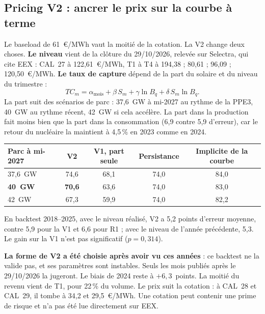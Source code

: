 \documentclass[11pt,a4paper]{article}
\begin{document}
\subsection{Pricing V2 : ancrer le prix sur la courbe à terme}
\label{sec:v2}

Le baseload de 61~€/MWh vaut la moitié de la cotation. La V2 change deux choses. \textbf{Le niveau} vient de la clôture du 29/10/2026, relevée sur Selectra, qui cite EEX : CAL~27 à 122,61~€/MWh, T1 à T4 à 194,38 ; 80,61 ; 96,09 ; 120,50~€/MWh. \textbf{Le taux de capture} dépend de la part du solaire et du niveau du trimestre :
\[
TC_m = \alpha_{\text{mois}} + \beta\, S_m + \gamma \ln B_q + \delta\, S_m \ln B_q .
\]
La part suit des scénarios de parc : 37,6~GW à mi-2027 au rythme de la PPE3, 40~GW au rythme récent, 42~GW si cela accélère. La part dans la production fait moins bien que la part dans la consommation (6,9 contre 5,9 d'erreur), car le retour du nucléaire la maintient à 4,5\,\% en 2023 comme en 2024.

\begin{center}
\small
\begin{tabular}{lcccc}
\toprule
\textbf{Parc à mi-2027} & \textbf{V2} & \textbf{V1, part seule} & \textbf{Persistance} & \textbf{Implicite de la courbe} \\
\midrule
37,6~GW & 74,6 & 68,1 & 74,0 & 84,0 \\
\textbf{40~GW} & \textbf{70,6} & 63,6 & 74,0 & 83,0 \\
42~GW & 67,3 & 59,9 & 74,0 & 82,2 \\
\bottomrule
\end{tabular}
\end{center}

En backtest 2018--2025, avec le niveau réalisé, V2 a 5,2 points d'erreur moyenne, contre 5,9 pour la V1 et 6,6 pour R1 ; avec le niveau de l'année précédente, 5,3. Le gain sur la V1 n'est pas significatif ($p = 0{,}314$).

\begin{attention}
\textbf{La forme de V2 a été choisie après avoir vu ces années} : ce backtest ne la valide pas, et ses paramètres sont instables. Seuls les mois publiés après le 29/10/2026 la jugeront. Le biais de 2024 reste à $+6{,}3$~points. La moitié du revenu vient de T1, pour 22\,\% du volume. Le prix suit la cotation : à CAL~28 et CAL~29, il tombe à 34,2 et 29,5~€/MWh. Une cotation peut contenir une prime de risque et n'a pas été lue directement sur EEX.
\end{attention}
\end{document}
